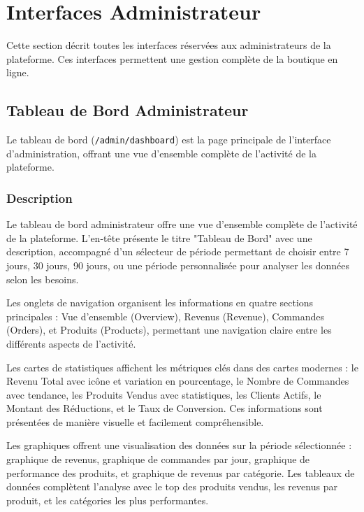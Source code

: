 \documentclass[12pt,a4paper]{article}
\begin{document}
\newpage

\section{Interfaces Administrateur}

Cette section décrit toutes les interfaces réservées aux administrateurs de la plateforme. Ces interfaces permettent une gestion complète de la boutique en ligne.

\subsection{Tableau de Bord Administrateur}

Le tableau de bord (\texttt{/admin/dashboard}) est la page principale de l'interface d'administration, offrant une vue d'ensemble complète de l'activité de la plateforme.

\subsubsection{Description}

Le tableau de bord administrateur offre une vue d'ensemble complète de l'activité de la plateforme. L'en-tête présente le titre "Tableau de Bord" avec une description, accompagné d'un sélecteur de période permettant de choisir entre 7 jours, 30 jours, 90 jours, ou une période personnalisée pour analyser les données selon les besoins.

Les onglets de navigation organisent les informations en quatre sections principales : Vue d'ensemble (Overview), Revenus (Revenue), Commandes (Orders), et Produits (Products), permettant une navigation claire entre les différents aspects de l'activité.

Les cartes de statistiques affichent les métriques clés dans des cartes modernes : le Revenu Total avec icône et variation en pourcentage, le Nombre de Commandes avec tendance, les Produits Vendus avec statistiques, les Clients Actifs, le Montant des Réductions, et le Taux de Conversion. Ces informations sont présentées de manière visuelle et facilement compréhensible.

Les graphiques offrent une visualisation des données sur la période sélectionnée : graphique de revenus, graphique de commandes par jour, graphique de performance des produits, et graphique de revenus par catégorie. Les tableaux de données complètent l'analyse avec le top des produits vendus, les revenus par produit, et les catégories les plus performantes.
\end{document}
